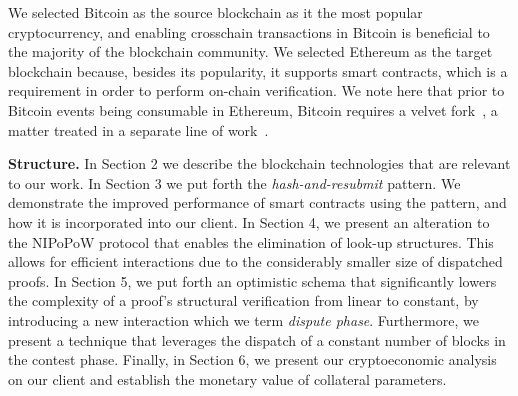 We selected Bitcoin as the source blockchain as it the most popular cryptocurrency,
and enabling crosschain transactions in Bitcoin is beneficial to the
majority of the blockchain community. We selected Ethereum as the target blockchain
because, besides its popularity, it supports smart contracts, which is a
requirement in order to perform on-chain verification. We note here that
prior to Bitcoin events being consumable in Ethereum, Bitcoin requires a
velvet fork~\cite{velvet-fork}, a matter treated in a separate line of
work~\cite{velvet-nipopows}.


\noindent
\textbf{Structure.} In Section 2 we describe the blockchain technologies that
are relevant to our work. In Section 3 we put forth the
\emph{hash-and-resubmit} pattern. We demonstrate the improved performance of
smart contracts using the pattern, and how it is incorporated into our
client. In Section 4, we present an alteration to the NIPoPoW protocol that
enables the elimination of look-up structures. This allows for efficient
interactions due to the considerably smaller size of dispatched proofs. In
Section 5, we put forth an optimistic schema that significantly lowers the
complexity of a proof's structural verification from linear to constant, by
introducing a new interaction which we term \emph{dispute phase}. Furthermore,
we present a technique that leverages the dispatch of a constant number of blocks
in the contest phase. Finally, in Section 6, we present our cryptoeconomic analysis
on our client and establish the monetary value of collateral parameters.
